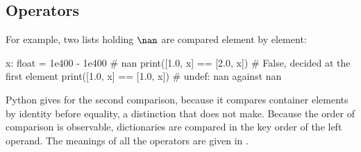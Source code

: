 \subsection{Operators}
\label{sec:operational-semantics-operators}



For example, two lists holding $\nan$ are compared element by element:

\begin{python}
x: float = 1e400 - 1e400  # nan
print([1.0, x] == [2.0, x])  # False, decided at the first element
print([1.0, x] == [1.0, x])  # undef: nan against nan
\end{python}

\noindent Python gives  for the second comparison, because it compares container elements by
identity before equality, a distinction that \PurePy does not make. Because the order of comparison is observable,
dictionaries are compared in the key order of the left operand. The meanings of all the operators are given in .

